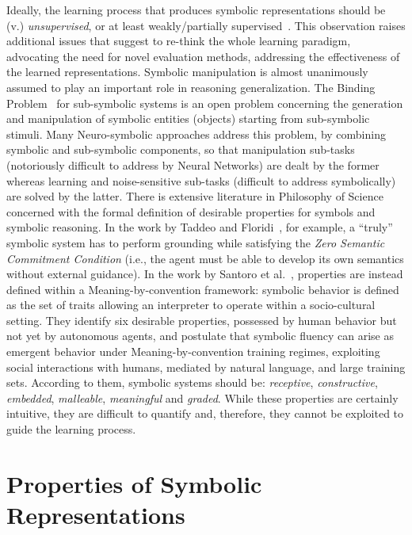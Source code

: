 %
Ideally, the learning process that produces symbolic representations should be (v.) \textit{unsupervised}, or at least weakly/partially supervised~\cite{stammer2022interactive}. This observation raises additional issues that suggest to re-think the whole learning paradigm, advocating the need for novel evaluation methods, addressing the effectiveness of the learned representations.
%
Symbolic manipulation is almost unanimously assumed to play an important role in reasoning generalization. The Binding Problem~\cite{greff2020binding} for sub-symbolic systems is an open problem concerning the generation and manipulation of symbolic entities (objects) starting from sub-symbolic stimuli. Many Neuro-symbolic approaches address this problem, by combining symbolic and sub-symbolic components, so that manipulation sub-tasks (notoriously difficult to address by Neural Networks) are dealt by the former whereas learning and noise-sensitive sub-tasks (difficult to address symbolically) are solved by the latter.
%
There is extensive literature in Philosophy of Science concerned with the formal definition of desirable properties for symbols and symbolic reasoning.
%
In the work by Taddeo and Floridi~\cite{taddeo2005solving}, for example, a ``truly'' symbolic system has to perform grounding while satisfying the \textit{Zero Semantic Commitment Condition} (i.e., the agent must be able to develop its own semantics without external guidance). In the work by Santoro et al.~\cite{santoro2021symbolic}, properties are instead defined within a Meaning-by-convention framework: symbolic behavior is defined as the set of traits allowing an interpreter to operate within a socio-cultural setting. They identify six desirable properties, possessed by human behavior but not yet by autonomous agents, and postulate that symbolic fluency can arise as emergent behavior under Meaning-by-convention training regimes, exploiting social interactions with humans, mediated by natural language, and large training sets. According to them, symbolic systems should be: \textit{receptive}, \textit{constructive}, \textit{embedded}, \textit{malleable}, \textit{meaningful} and \textit{graded}. While these properties are certainly intuitive, they are difficult to quantify and, therefore, they cannot be exploited to guide the learning process.

\section{Properties of Symbolic Representations}
\label{nesy2023:sec:psr}

